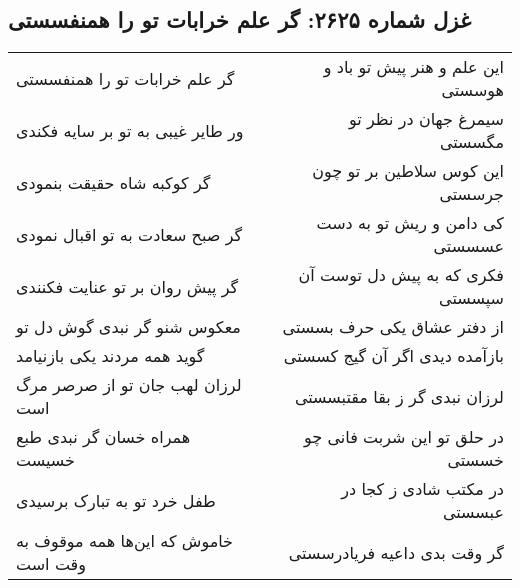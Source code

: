 \begin{center}
\section*{غزل شماره ۲۶۲۵: گر علم خرابات تو را همنفسستی}
\label{sec:2625}
\begin{longtable}{l p{0.5cm} r}
گر علم خرابات تو را همنفسستی
&&
این علم و هنر پیش تو باد و هوسستی
\\
ور طایر غیبی به تو بر سایه فکندی
&&
سیمرغ جهان در نظر تو مگسستی
\\
گر کوکبه شاه حقیقت بنمودی
&&
این کوس سلاطین بر تو چون جرسستی
\\
گر صبح سعادت به تو اقبال نمودی
&&
کی دامن و ریش تو به دست عسسستی
\\
گر پیش روان بر تو عنایت فکنندی
&&
فکری که به پیش دل توست آن سپسستی
\\
معکوس شنو گر نبدی گوش دل تو
&&
از دفتر عشاق یکی حرف بسستی
\\
گوید همه مردند یکی بازنیامد
&&
بازآمده دیدی اگر آن گیج کسستی
\\
لرزان لهب جان تو از صرصر مرگ است
&&
لرزان نبدی گر ز بقا مقتبسستی
\\
همراه خسان گر نبدی طبع خسیست
&&
در حلق تو این شربت فانی چو خسستی
\\
طفل خرد تو به تبارک برسیدی
&&
در مکتب شادی ز کجا در عبسستی
\\
خاموش که این‌ها همه موقوف به وقت است
&&
گر وقت بدی داعیه فریادرسستی
\\
\end{longtable}
\end{center}
